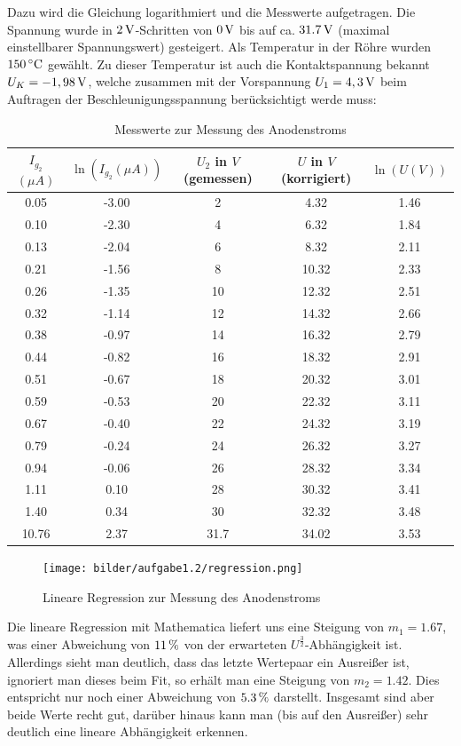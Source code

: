 \documentclass[a4paper,titlepage]{scrartcl}
\numberwithin{equation}{section}
\begin{document}
Dazu wird die Gleichung logarithmiert und die Messwerte aufgetragen. Die Spannung wurde in $\unit[2]{V}$-Schritten von $\unit[0]{V}$ bis auf ca. $\unit[31.7]{V}$ (maximal einstellbarer Spannungswert) gesteigert. Als Temperatur in der Röhre wurden $\unit[150]{^\circ C}$ gewählt. Zu dieser Temperatur ist auch die Kontaktspannung bekannt $U_{K}=\unit[-1,98]{V}$, welche zusammen mit der Vorspannung $U_1= \unit[4,3]{V}$ beim Auftragen der Beschleunigungsspannung berücksichtigt werde muss:

\begin{table}[H]
\centering
\caption{Messwerte zur Messung des Anodenstroms}
	\begin{tabular}{c|c|c|c|c}
   $I_{g_2}$ $(\mu A)$ & $\ln{(I_{g_2} (\mu A))}$ & $U_2$ in $V$ (gemessen) & $U$ in $V$ (korrigiert) & $\ln{(U (V))}$ \\
		\hline
		0.05 & -3.00 & 2 & 4.32 & 1.46 \\
        0.10 & -2.30 & 4 & 6.32 & 1.84 \\
	    0.13 & -2.04 & 6 & 8.32 & 2.11 \\
	    0.21 & -1.56 & 8 & 10.32 & 2.33 \\
	    0.26 & -1.35 & 10 & 12.32 & 2.51 \\
	    0.32 & -1.14 & 12 & 14.32 & 2.66 \\
	    0.38 & -0.97 & 14 & 16.32 & 2.79 \\
	    0.44 & -0.82 & 16 & 18.32 & 2.91 \\
	    0.51 & -0.67 & 18 & 20.32 & 3.01 \\
	    0.59 & -0.53 & 20 & 22.32 & 3.11 \\
	    0.67 & -0.40 & 22 & 24.32 & 3.19 \\
	    0.79 & -0.24 & 24 & 26.32 & 3.27 \\
	    0.94 & -0.06 & 26 & 28.32 & 3.34\\
	    1.11 & 0.10 & 28 & 30.32 & 3.41 \\
	    1.40 & 0.34 & 30 & 32.32 & 3.48 \\
	    10.76 & 2.37 & 31.7 & 34.02 & 3.53 \\
	\end{tabular}
\end{table}

\begin{figure}[H]
\centering
\texttt{[image: bilder/aufgabe1.2/regression.png]} 
\caption{Lineare Regression zur Messung des Anodenstroms}
\end{figure}

Die lineare Regression mit Mathematica liefert uns eine Steigung von $m_1= 1.67$, was einer Abweichung von $\unit[11]{\%}$ von der erwarteten $U^{\frac{3}{2}}$-Abhängigkeit ist. Allerdings sieht man deutlich, dass das letzte Wertepaar ein Ausreißer ist, ignoriert man dieses beim Fit, so erhält man eine Steigung von $m_2= 1.42$. Dies entspricht nur noch einer Abweichung von $\unit[5.3]{\%}$ darstellt. Insgesamt sind aber beide Werte recht gut, darüber hinaus kann man (bis auf den Ausreißer) sehr deutlich eine lineare Abhängigkeit erkennen.
\end{document}
